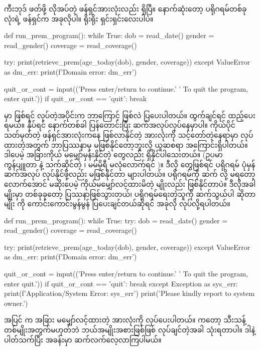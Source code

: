 ကီးဘုဒ်  ဖတ်ဖို့ လိုအပ်တဲ့ ဖန်ရှင်အားလုံးလည်း ရှိပြီ။ နောက်ဆုံးတော့ ပရိုဂရမ်တစ်ခုလုံးရဲ့  ဖန်ရှင်က အခုလိုပါ။ ရိုးရိုး ရှင်းရှင်းလေးပါပဲ။
%
\begin{py}
def run_prem_program():
    while True:
        dob = read_date()
        gender = read_gender()
        coverage = read_coverage()

        try:
            print(retrieve_prem(age_today(dob),
                                gender,
                                coverage))
        except ValueError as dm_err:
            print(f'Domain error: {dm_err}')

        quit_or_cont = input(('Press enter/return to continue.'
                              ' To quit the program, enter quit.'))
        if quit_or_cont == 'quit':
            break
\end{py}
%
 မှာ  ဖြစ်ရင်  လုပ်တဲ့အပိုင်းက ဘာကြောင့်  ဖြစ်လဲ ပြပေးပါတယ်။ ထွက်ချင်ရင်  ထည့်ပေးရမယ်။  နှိပ်ရင် နောက်တစ်ခါ  ပြန်တောင်းပြီး ဆက်အလုပ်လုပ်နေမှာပါ။ ကိုယ်ပိုင် သတ်မှတ်တဲ့ ဖန်ရှင်အားလုံးကနေ ဖြစ်လာနိုင်တဲ့  အားလုံးကို သင့်တော်တဲ့နေရာမှာ  လုပ်ထားတဲ့အတွက် ဘာပြဿနာမှ မဖြစ်နိုင်တော့ဘူးလို့ ယူဆစရာ အကြောင်းရှိပါတယ်။ ဒါပေမဲ့ အခြားကိုယ် မမျှော်မှန်းနိုင်တဲ့  တွေလည်း ရှိနိုင်ပါသေးတယ်။ (ဥပမာ ကွန်ပျူတာ  နဲ့ သက်ဆိုင်တဲ့  ၊ မမ်မိုရီ မလုံလောက်ရင် )။ ဒီလို  တွေဖြစ်ရင် ပရိုဂရမ် ပုံမှန်ဆက်အလုပ် လုပ်နိုင်ဖို့လည်း မဖြစ်နိုင်တာ များပါတယ်။ ပရိုဂရမ်ကို ဆက်  လို့ မရတော့လောက်အောင် မဆိုးပေမဲ့ ကိုယ်မမျှော်လင့်ထားမိတဲ့  မျိုးလည်း ဖြစ်နိုင်တာပဲ။ ဒီလိုအခါမျိုးမှာ တစ်ခုခုတော့ ပြဿနာဖြစ်သွားတယ်၊ ပရိုဂရမ်ရေးတဲ့သူကို ဆက်သွယ်ပါ ဆိုတာမျိုး  ကို  ကောင်းကောင်းမွန်မွန် ပြပေးချင်တယ်ဆိုရင် အခုလို လုပ်လို့ရပါတယ်။


%
\begin{py}
def run_prem_program():
    while True:
        try:
            dob = read_date()
            gender = read_gender()
            coverage = read_coverage()

            try:
                print(retrieve_prem(age_today(dob),
                                    gender,
                                    coverage))
            except ValueError as dm_err:
                print(f'Domain error: {dm_err}')

            quit_or_cont = input(('Press enter/return to continue.'
                                  ' To quit the program, enter quit.'))
            if quit_or_cont == 'quit':
                break
        except Exception as sys_err:
            print(f'Application/System Error: {sys_err}')
            print('Please kindly report to system owner.')
\end{py}
%
အပြင်  က အခြား မမျှော်လင့်ထားတဲ့  အားလုံးကို  လုပ်ပေးပါတယ်။  ကတော့ သီးသန့်  တစ်မျိုးအတွက်မဟုတ်ဘဲ ဘယ်အမျိုးအစားဖြစ်ဖြစ်  လုပ်ချင်တဲ့အခါ သုံးရတာပါ။ ဒါနဲ့ ပါတ်သက်ပြီး  အခန်းမှာ ဆက်လက်လေ့လာကြပါမယ်။

